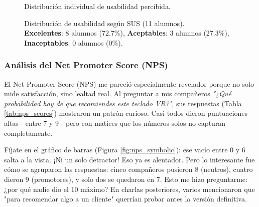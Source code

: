 \begin{figure}[H]
	\centering
	\caption{Distribución individual de usabilidad percibida.}
	\label{fig:barras}
\end{figure}
\begin{figure}[H]
	\centering
	\caption{Distribución de usabilidad según SUS (11 alumnos). \\ 
		\textbf{Excelentes}: 8 alumnos (72.7\%), \textbf{Aceptables}: 3 alumnos (27.3\%), \textbf{Inaceptables}: 0 alumnos (0\%).}
	\label{fig:sus_pie}
\end{figure}



\subsubsection{Análisis del Net Promoter Score (NPS)}

El Net Promoter Score (NPS) me pareció especialmente revelador porque no solo mide satisfacción, sino lealtad real. Al preguntar a mis compañeros \textit{"¿Qué probabilidad hay de que recomiendes este teclado VR?"}, sus respuestas (Tabla \ref{tab:nps_scores}) mostraron un patrón curioso. Casi todos dieron puntuaciones altas - entre 7 y 9 - pero con matices que los números solos no capturan completamente.

Fíjate en el gráfico de barras (Figura \ref{fig:nps_symbolic}): ese vacío entre 0 y 6 salta a la vista. ¡Ni un solo detractor! Eso ya es alentador. Pero lo interesante fue cómo se agruparon las respuestas: cinco compañeros pusieron 8 (neutros), cuatro dieron 9 (promotores), y solo dos se quedaron en 7. Esto me hizo preguntarme: ¿por qué nadie dio el 10 máximo? En charlas posteriores, varios mencionaron que "para recomendar algo a un cliente" querrían probar antes la versión definitiva.

